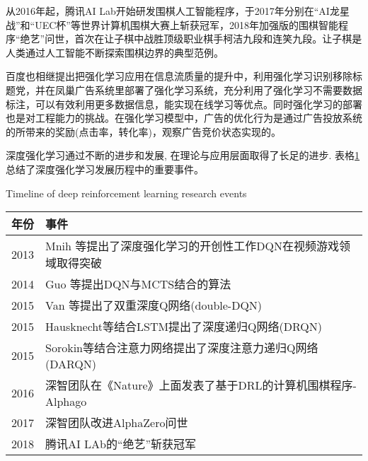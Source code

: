 从2016年起，腾讯AI Lab开始研发围棋人工智能程序，于2017年分别在“AI龙星战”和“UEC杯”等世界计算机围棋大赛上斩获冠军，2018年加强版的围棋智能程序“绝艺”问世，首次在让子棋中战胜顶级职业棋手柯洁九段和连笑九段。让子棋是人类通过人工智能不断探索围棋边界的典型范例。

百度也相继提出把强化学习应用在信息流质量的提升中，利用强化学习识别移除标题党，并在凤巢广告系统里部署了强化学习系统，充分利用了强化学习不需要数据标注，可以有效利用更多数据信息，能实现在线学习等优点。同时强化学习的部署也是对工程能力的挑战。在强化学习模型中，广告的优化行为是通过广告投放系统的所带来的奖励(点击率，转化率)，观察广告竞价状态实现的。

深度强化学习通过不断的进步和发展, 在理论与应用层面取得了长足的进步. 表格\ref{tab:1}总结了深度强化学习发展历程中的重要事件。
\begin{table}[!hpb]
	\centering
	{Timeline of deep reinforcement learning research events}
	\label{tab:1}
	\begin{tabular}{ll}
		年份 & 事件 \\ \midrule
		2013 & Mnih 等提出了深度强化学习的开创性工作DQN在视频游戏领域取得突破 \\
		2014& Guo 等提出DQN与MCTS结合的算法 \\
		2015 &Van 等提出了双重深度Q网络(double-DQN) \\
		2015&Hausknecht等结合LSTM提出了深度递归Q网络(DRQN)\\
		2015&Sorokin等结合注意力网络提出了深度注意力递归Q网络(DARQN)\\
		2016&深智团队在《Nature》上面发表了基于DRL的计算机围棋程序-Alphago\\
		2017&深智团队改进AlphaZero问世\\
		2018&腾讯AI LAb的“绝艺”斩获冠军\\
		 \bottomrule
	\end{tabular}
\end{table}
